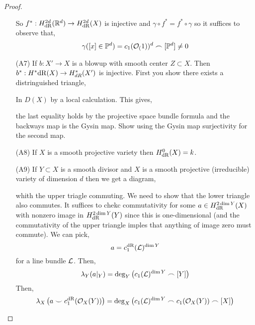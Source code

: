 \documentclass[12pt]{article}
\begin{document}
\begin{proof}
\begin{enumerate}
\begin{center}
\begin{tikzcd}
\end{tikzcd}
\end{center}
So $f^* : H^{2d}_{\dR}(\R^d) \to H^{2d}_{\dR}(X)$ is injective and $\gamma \circ f^* = f^* \circ \gamma$ so it suffices to observe that,
\[ \gamma( [x] \in \P^d) = c_1(\struct(1))^d \frown [\P^d] \neq 0 \]
\item[(A7)] If $b : X' \to X$ is a blowup with smooth center $Z \subset X$. Then $b^* : H^*{\dR}(X) \to H^*_{dR}(X')$ is injective. First you show there exists a distringuished triangle,
\begin{center}
\end{center}
In $D(X)$ by a local calculation. This gives,
\begin{center}
\end{center} 
the last equality holds by the projective space bundle formula and the backways map is the Gysin map. Show using the Gysin map surjectivity for the second map.
\item[(A8)] If $X$ is a smooth projective variety then $H^0_{\dR}(X) = k$.
\item[(A9)] If $Y \subset X$ is a smooth divisor and $X$ is a smooth projective (irreducible) variety of dimension $d$ then we get a diagram,
\begin{center}
\end{center}
whith the upper triagle commuting. We need to show that the lower triangle also commutes. It suffices to chekc commutativity for some $a \in H^{2 \dim{Y}}_{\dR}(X)$ with nonzero image in $H^{2 \dim{Y}}_{\dR}(Y)$ since this is one-dimensional (and the commutativity of the upper triangle imples that anything of image zero must commute). We can pick,
\[ a = c_1^{\dR}(\L)^{\dim{Y}} \]
for a line bundle $\L$. Then,
\[ \lambda_Y(a|_Y) = \deg_Y \left( c_1(\L)^{\dim{Y}} \frown [Y] \right) \]
Then,
\[ \lambda_X \left( a \smile c_1^{\dR}(\struct{X}(Y)) \right) = \deg_X \left( c_1(\L)^{\dim{Y}} \frown c_1(\struct{X}(Y)) \frown [X] \right) \]
\end{enumerate}
\end{proof}
\end{document}

